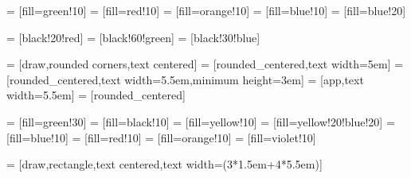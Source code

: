 \newcommand\blockonewidth{5.5em}
\newcommand\blockspacing{1.5em}

 = [fill=green!10]
 = [fill=red!10]
 = [fill=orange!10]
 = [fill=blue!10]
 = [fill=blue!20]

 = [black!20!red]
 = [black!60!green]
 = [black!30!blue]


 = [draw,rounded corners,text centered]
 = [rounded_centered,text width=5em]
 = [rounded_centered,text width=\blockonewidth,minimum height=3em]
 = [app,text width=\blockonewidth]
 = [rounded_centered]

 = [fill=green!30]
 = [fill=black!10]
 = [fill=yellow!10]
 = [fill=yellow!20!blue!20]
 = [fill=blue!10]
 = [fill=red!10]
 = [fill=orange!10]
 = [fill=violet!10]



\newcommand\rmrlenght{(3*\blockspacing+4*\blockonewidth)}
 = [draw,rectangle,text centered,text width={\rmrlenght}]
